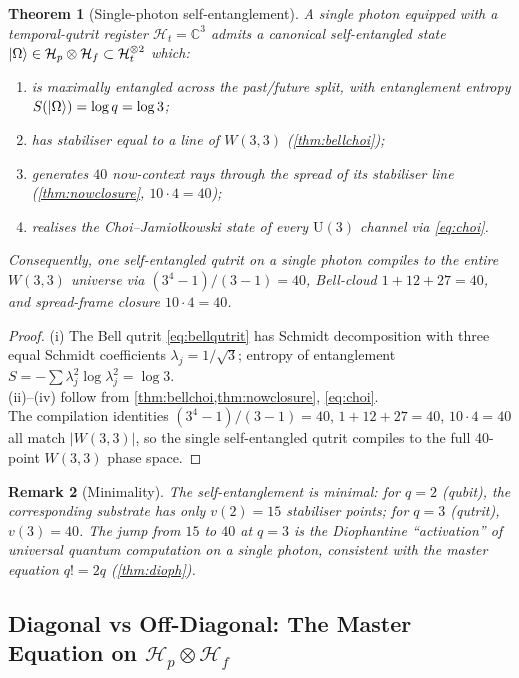 ﻿\documentclass[12pt]{article}
\newtheorem{theorem}{Theorem}[section]
\newtheorem{remark}[theorem]{Remark}
\newcommand{\CC}{\mathbb{C}}
\begin{document}
\begin{theorem}[Single-photon self-entanglement]\label{thm:selfent}
A single photon equipped with a temporal-qutrit register $\mathcal H_t = \CC^3$
admits a canonical self-entangled state $\ket{\Omega} \in \mathcal H_p \otimes
\mathcal H_f \subset \mathcal H_t^{\otimes 2}$ which:
\begin{enumerate}[label=(\roman*),noitemsep]
  \item is maximally entangled across the past/future split, with entanglement
    entropy $S(\ket{\Omega}) = \log q = \log 3$;
  \item has stabiliser equal to a line of $W(3,3)$ (\cref{thm:bellchoi});
  \item generates $40$ now-context rays through the spread of its stabiliser line
    (\cref{thm:nowclosure}, $10\cdot 4 = 40$);
  \item realises the Choi--Jamio\l kowski state of every $\mathrm{U}(3)$ channel
    via \eqref{eq:choi}.
\end{enumerate}
Consequently, one self-entangled qutrit on a single photon compiles to the entire
$W(3,3)$ universe via $(3^4 - 1)/(3-1) = 40$, Bell-cloud $1 + 12 + 27 = 40$, and
spread-frame closure $10 \cdot 4 = 40$.
\end{theorem}

\begin{proof}
(i) The Bell qutrit \eqref{eq:bellqutrit} has Schmidt decomposition with three
equal Schmidt coefficients $\lambda_j = 1/\sqrt 3$; entropy of entanglement
$S = -\sum \lambda_j^2 \log \lambda_j^2 = \log 3$.\\
(ii)--(iv) follow from \cref{thm:bellchoi,thm:nowclosure}, \eqref{eq:choi}.\\
The compilation identities $(3^4-1)/(3-1)=40$, $1+12+27=40$, $10\cdot 4=40$ all
match $|W(3,3)|$, so the single self-entangled qutrit compiles to the full
40-point $W(3,3)$ phase space.
\end{proof}

\begin{remark}[Minimality]
The self-entanglement is \emph{minimal}: for $q=2$ (qubit), the corresponding
substrate has only $v(2) = 15$ stabiliser points; for $q=3$ (qutrit), $v(3) = 40$.
The jump from $15$ to $40$ at $q=3$ is the Diophantine ``activation'' of universal
quantum computation on a single photon, consistent with the master equation
$q! = 2q$ (\cref{thm:dioph}).
\end{remark}

\subsection{Diagonal vs Off-Diagonal: The Master Equation on $\mathcal H_p\otimes\mathcal H_f$}
\label{sec:diag_offdiag}
\end{document}
